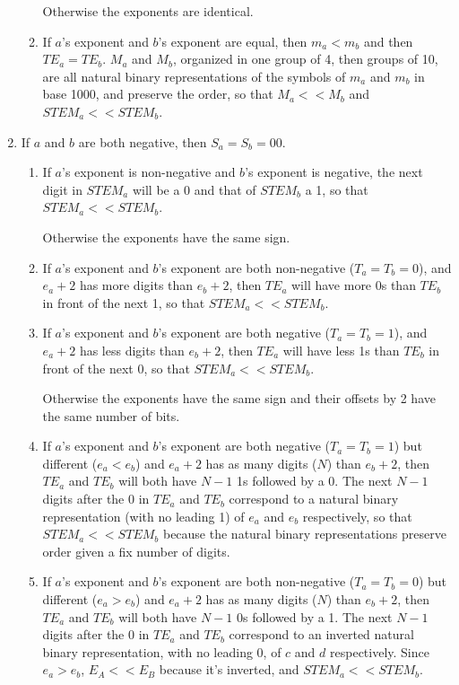 \documentclass{acm_proc_article-sp}
\begin{document}
\begin{enumerate}
\begin{enumerate}
  Otherwise the exponents are identical.
  \item If $a$'s exponent and $b$'s exponent are equal, then $m_a < m_b$ and then $TE_a=TE_b$. $M_a$ and $M_b$, organized in one group of 4, then groups of 10, are all natural binary representations of the symbols of $m_a$ and $m_b$ in base 1000, and preserve the order, so that $M_a<<M_b$ and $STEM_a << STEM_b$.
  \end{enumerate}


\item If $a$ and $b$ are both negative, then $S_a=S_b=00$.
  \begin{enumerate}
  \item If $a$'s exponent is non-negative and $b$'s exponent is negative, the next digit in $STEM_a$ will be a 0 and that of $STEM_b$ a 1, so that $STEM_a << STEM_b$.

  Otherwise the exponents have the same sign.
  \item If $a$'s exponent and $b$'s exponent are both non-negative ($T_a=T_b=0$), and $e_a+2$ has more digits than $e_b+2$, then $TE_a$ will have more 0s than $TE_b$ in front of the next 1, so that $STEM_a << STEM_b$.
  \item If $a$'s exponent and $b$'s exponent are both negative ($T_a=T_b=1$), and $e_a+2$ has less digits than $e_b+2$, then $TE_a$ will have less 1s than $TE_b$ in front of the next 0, so that $STEM_a << STEM_b$.

  Otherwise the exponents have the same sign and their offsets by 2 have the same number of bits.
  \item If $a$'s exponent and $b$'s exponent are both negative ($T_a=T_b=1$) but different ($e_a < e_b$) and $e_a+2$ has as many digits ($N$) than $e_b+2$, then $TE_a$ and $TE_b$ will both have $N-1$ 1s followed by a 0. The next $N-1$ digits after the 0 in $TE_a$ and $TE_b$ correspond to a natural binary representation (with no leading 1) of $e_a$ and $e_b$ respectively, so that $STEM_a << STEM_b$ because the natural binary representations preserve order given a fix number of digits.
  \item If $a$'s exponent and $b$'s exponent are both non-negative ($T_a=T_b=0$) but different ($e_a > e_b$) and $e_a+2$ has as many digits ($N$) than $e_b+2$, then $TE_a$ and $TE_b$ will both have $N-1$ 0s followed by a 1. The next $N-1$ digits after the 0 in $TE_a$ and $TE_b$ correspond to an inverted natural binary representation, with no leading 0, of $c$ and $d$ respectively. Since $e_a > e_b$, $E_A << E_B$ because it's inverted, and $STEM_a << STEM_b$.


\end{enumerate}
\end{enumerate}
\end{document}

